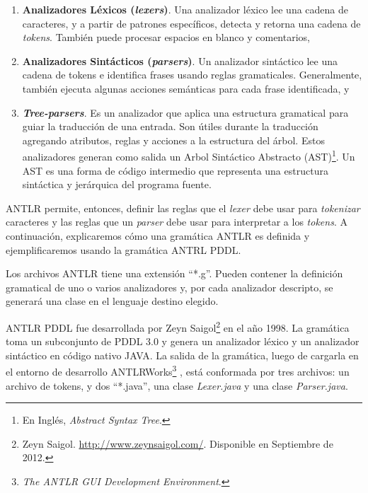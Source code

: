 \begin{enumerate}

\item {\bf Analizadores L\'exicos (\emph{lexers})}. Una analizador
l\'exico lee una cadena de caracteres, y a partir de patrones
espec\'ificos, detecta y retorna una cadena de \emph{tokens}. Tambi\'en
puede procesar espacios en blanco y comentarios, 

\item {\bf Analizadores Sint\'acticos (\emph{parsers})}. Un analizador
sint\'actico lee una cadena de tokens e identifica frases usando reglas
gramaticales. Generalmente, tambi\'en ejecuta algunas acciones sem\'anticas
para cada frase identificada, y 

\item {\bf \emph{Tree-parsers}}. Es un analizador que aplica una estructura
gramatical para guiar la traducci\'on de una entrada.
Son \'utiles durante la traducci\'on agregando atributos, 
reglas y acciones a la estructura del \'arbol. 
Estos analizadores generan como salida un Arbol
Sint\'actico Abstracto (AST)\footnote{En Ingl\'es, \emph{Abstract Syntax Tree}.}.
Un AST es una forma de c\'odigo intermedio que representa
una estructura sint\'actica y jer\'arquica del programa fuente.
 
\end{enumerate}

ANTLR permite, entonces, definir las reglas que el \emph{lexer}
debe usar para \emph{tokenizar} caracteres y las reglas
que un \emph{parser} debe usar para interpretar a los \emph{tokens}.
A continuaci\'on, explicaremos c\'omo una gram\'atica ANTLR es definida y
ejemplificaremos usando la gram\'atica ANTRL PDDL.

Los archivos ANTLR tiene una extensi\'on ``*.g''. Pueden contener
la definici\'on gramatical de uno o varios analizadores y, por cada 
analizador descripto, se generar\'a una clase en el lenguaje destino
elegido.

ANTLR PDDL fue desarrollada por Zeyn Saigol\footnote{Zeyn Saigol. 
\url{http://www.zeynsaigol.com/}. Disponible en Septiembre de 2012.} 
en el a\~{n}o 1998. La gram\'atica toma un 
subconjunto de PDDL 3.0 y genera un analizador l\'exico y un analizador
sint\'actico en c\'odigo nativo JAVA. La salida de la gram\'atica, luego
de cargarla en el entorno de desarrollo ANTLRWorks\footnote{\emph{The ANTLR GUI 
Development Environment}.} \cite{gbraun:antlrwork}, est\'a conformada por
tres archivos: un archivo de tokens, y dos ``*.java'', una
clase \emph{Lexer.java} y una clase \emph{Parser.java}.

